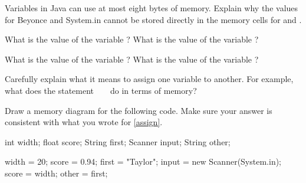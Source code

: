 \Q Variables in Java can use at most eight bytes of memory. Explain why the values for Beyonce and System.in cannot be stored directly in the memory cells for  and .

\begin{answer}
\end{answer}


\Q What is the value of the variable ? What is the value of the variable ?

\begin{answer}
\end{answer}


\Q What is the value of the variable ? What is the value of the variable ?

\begin{answer}
\end{answer}


\Q \label{assign} Carefully explain what it means to assign one variable to another. For example, what does the statement ~ ~ do in terms of memory?

\begin{answer}
\end{answer}


\Q Draw a memory diagram for the following code. Make sure your answer is consistent with what you wrote for \ref{assign}.

\begin{javalst}
int width;
float score;
String first;
Scanner input;
String other;

width = 20;
score = 0.94;
first = "Taylor";
input = new Scanner(System.in);
score = width;
other = first;
\end{javalst}
